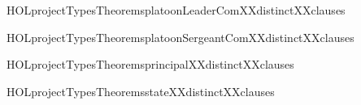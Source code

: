 \begin{SaveVerbatim}{HOLprojectTypesTheoremsplatoonLeaderComXXdistinctXXclauses}
\HOLTokenTurnstile{}  \HOLSymConst{\HOLTokenNotEqual{}}  \HOLSymConst{\HOLTokenConj{}}  \HOLSymConst{\HOLTokenNotEqual{}}  \HOLSymConst{\HOLTokenConj{}}  \HOLSymConst{\HOLTokenNotEqual{}} 
\end{SaveVerbatim}
\newcommand{\HOLprojectTypesTheoremsplatoonLeaderComXXdistinctXXclauses}{\UseVerbatim{HOLprojectTypesTheoremsplatoonLeaderComXXdistinctXXclauses}}
\begin{SaveVerbatim}{HOLprojectTypesTheoremsplatoonSergeantComXXdistinctXXclauses}
\HOLTokenTurnstile{}  \HOLSymConst{\HOLTokenNotEqual{}} 
\end{SaveVerbatim}
\newcommand{\HOLprojectTypesTheoremsplatoonSergeantComXXdistinctXXclauses}{\UseVerbatim{HOLprojectTypesTheoremsplatoonSergeantComXXdistinctXXclauses}}
\begin{SaveVerbatim}{HOLprojectTypesTheoremsprincipalXXdistinctXXclauses}
\HOLTokenTurnstile{}  \HOLSymConst{\HOLTokenNotEqual{}}  \HOLSymConst{\HOLTokenConj{}}  \HOLSymConst{\HOLTokenNotEqual{}}  \HOLSymConst{\HOLTokenConj{}}
    \HOLSymConst{\HOLTokenNotEqual{}} 
\end{SaveVerbatim}
\newcommand{\HOLprojectTypesTheoremsprincipalXXdistinctXXclauses}{\UseVerbatim{HOLprojectTypesTheoremsprincipalXXdistinctXXclauses}}
\begin{SaveVerbatim}{HOLprojectTypesTheoremsstateXXdistinctXXclauses}
\HOLTokenTurnstile{}  \HOLSymConst{\HOLTokenNotEqual{}}  \HOLSymConst{\HOLTokenConj{}}  \HOLSymConst{\HOLTokenNotEqual{}}  \HOLSymConst{\HOLTokenConj{}}
    \HOLSymConst{\HOLTokenNotEqual{}}  \HOLSymConst{\HOLTokenConj{}}  \HOLSymConst{\HOLTokenNotEqual{}}  \HOLSymConst{\HOLTokenConj{}}
    \HOLSymConst{\HOLTokenNotEqual{}}  \HOLSymConst{\HOLTokenConj{}}  \HOLSymConst{\HOLTokenNotEqual{}}  \HOLSymConst{\HOLTokenConj{}}  \HOLSymConst{\HOLTokenNotEqual{}}  \HOLSymConst{\HOLTokenConj{}}
    \HOLSymConst{\HOLTokenNotEqual{}}  \HOLSymConst{\HOLTokenConj{}}  \HOLSymConst{\HOLTokenNotEqual{}}  \HOLSymConst{\HOLTokenConj{}}
    \HOLSymConst{\HOLTokenNotEqual{}} 
\end{SaveVerbatim}
